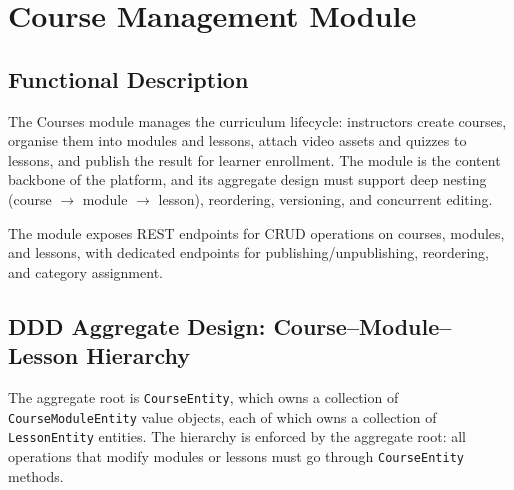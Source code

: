 
\section{Course Management Module}
\label{sec:course-module}

\subsection{Functional Description}

The Courses module manages the curriculum lifecycle: instructors create courses, organise them into modules and lessons, attach video assets and quizzes to lessons, and publish the result for learner enrollment. The module is the content backbone of the platform, and its aggregate design must support deep nesting (course $\rightarrow$ module $\rightarrow$ lesson), reordering, versioning, and concurrent editing.

The module exposes REST endpoints for CRUD operations on courses, modules, and lessons, with dedicated endpoints for publishing/unpublishing, reordering, and category assignment.

\subsection{DDD Aggregate Design: Course--Module--Lesson Hierarchy}

The aggregate root is \texttt{CourseEntity}, which owns a collection of \texttt{CourseModuleEntity} value objects, each of which owns a collection of \texttt{LessonEntity} entities. The hierarchy is enforced by the aggregate root: all operations that modify modules or lessons must go through \texttt{CourseEntity} methods.


